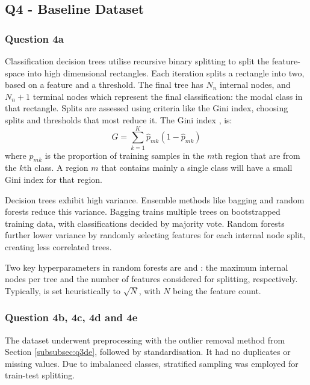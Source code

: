 
\subsection{Q4 - Baseline Dataset}\label{subsec:q4}
\subsubsection{Question 4a}\label{subsubsec:q4a}
    Classification decision trees utilise recursive binary splitting to split the feature-space into high dimensional
    rectangles.
    Each iteration splits a rectangle into two, based on a feature and a threshold.
    The final tree has $N_{n}$ internal nodes, and $N_{n} + 1$ terminal nodes which represent the final classification:
    the modal class in that rectangle.
    Splits are assessed using criteria like the Gini index, choosing splits and thresholds that most reduce it.
    The Gini index \cite{ISL}, is:
    \begin{equation}
        G = \sum_{k=1}^{K} \hat{p}_{mk}(1 - \hat{p}_{mk})
        \label{eq:gini-index}
    \end{equation}
    where $\hat{p}_{mk}$ is the proportion of training samples in the $m$th region that are from the $k$th class.
    A region $m$ that contains mainly a single class will have a small Gini index for that region.

    Decision trees exhibit high variance.
    Ensemble methods like bagging and random forests reduce this variance.
    Bagging trains multiple trees on bootstrapped training data, with classifications decided by majority vote.
    Random forests further lower variance by randomly selecting features for each internal node split, creating less
    correlated trees.

    Two key hyperparameters in random forests are  and : the maximum
    internal nodes per tree and the number of features considered for splitting, respectively.
    Typically,  is set heuristically to $\sqrt{N}$, with $N$ being the feature count.

\subsubsection{Question 4b, 4c, 4d and 4e}\label{subsubsec:q4bcde}
    The dataset underwent preprocessing with the outlier removal method from Section \ref{subsubsec:q3de}, followed by
    standardisation.
    It had no duplicates or missing values.
    Due to imbalanced classes, stratified sampling was employed for train-test splitting.

